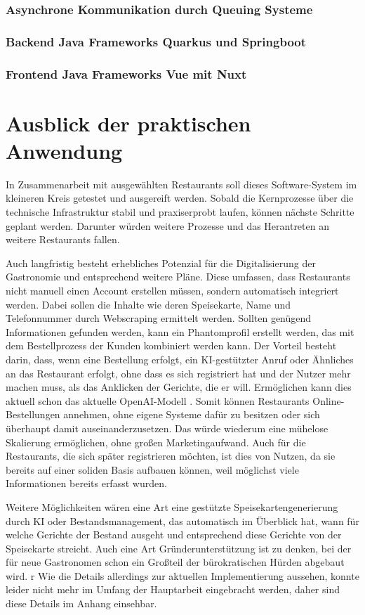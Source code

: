 \subsubsection{Asynchrone Kommunikation durch Queuing Systeme}
\subsubsection{Backend Java Frameworks Quarkus und Springboot}
\subsubsection{Frontend Java Frameworks Vue mit Nuxt}

\section{Ausblick der praktischen Anwendung}
\label{sec:zukunft}

In Zusammenarbeit mit ausgewählten Restaurants soll dieses Software-System im kleineren Kreis getestet und ausgereift werden. Sobald die Kernprozesse über die technische Infrastruktur stabil und praxiserprobt laufen, können nächste Schritte geplant werden. Darunter würden weitere Prozesse und das Herantreten an weitere Restaurants fallen. 

Auch langfristig besteht erhebliches Potenzial für die Digitalisierung der Gastronomie und entsprechend weitere Pläne. Diese umfassen, dass Restaurants nicht manuell einen Account erstellen müssen, sondern automatisch integriert werden. Dabei sollen die Inhalte wie deren Speisekarte, Name und Telefonnummer durch Webscraping ermittelt werden. Sollten genügend Informationen gefunden werden, kann ein Phantomprofil erstellt werden, das mit dem Bestellprozess der Kunden kombiniert werden kann. Der Vorteil besteht darin, dass, wenn eine Bestellung erfolgt, ein \acs{KI}-gestützter Anruf oder Ähnliches an das Restaurant erfolgt, ohne dass es sich registriert hat und der Nutzer mehr machen muss, als das Anklicken der Gerichte, die er will. Ermöglichen kann dies aktuell schon das aktuelle OpenAI-Modell \citep[vgl.][]{openai_introducing_2024}. Somit können Restaurants Online-Bestellungen annehmen, ohne eigene Systeme dafür zu besitzen oder sich überhaupt damit auseinanderzusetzen. Das würde wiederum eine mühelose Skalierung ermöglichen, ohne großen Marketingaufwand. Auch für die Restaurants, die sich später registrieren möchten, ist dies von Nutzen, da sie bereits auf einer soliden Basis aufbauen können, weil möglichst viele Informationen bereits erfasst wurden.

Weitere Möglichkeiten wären eine Art eine gestützte Speisekartengenerierung durch \acs{KI} oder Bestandsmanagement, das automatisch im Überblick hat, wann für welche Gerichte der Bestand ausgeht und entsprechend diese Gerichte von der Speisekarte streicht. Auch eine Art Gründerunterstützung ist zu denken, bei der für neue Gastronomen schon ein Großteil der bürokratischen Hürden abgebaut wird.
r
Wie die Details allerdings zur aktuellen Implementierung aussehen, konnte leider nicht mehr im Umfang der Hauptarbeit eingebracht werden, daher sind diese Details im Anhang einsehbar.
